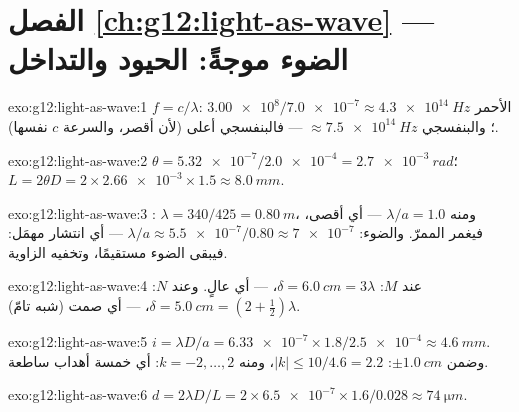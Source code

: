 \section*{الفصل \ref{ch:g12:light-as-wave} --- الضوء موجةً: الحيود والتداخل}

\begin{solution}{exo:g12:light-as-wave:1}
$f = c/\lambda$: الأحمر $\num{3.00e8}/\num{7.0e-7} \approx
\qty{4.3e14}{Hz}$؛ والبنفسجي $\approx \qty{7.5e14}{Hz}$ --- فالبنفسجي
أعلى (لأن  أقصر، والسرعة $c$ نفسها).
\end{solution}

\begin{solution}{exo:g12:light-as-wave:2}
$\theta = \num{5.32e-7}/\num{2.0e-4} = \qty{2.7e-3}{rad}$؛
$L = 2\theta D = 2 \times \num{2.66e-3} \times 1.5 \approx
\qty{8.0}{mm}$.
\end{solution}

\begin{solution}{exo:g12:light-as-wave:3}
: $\lambda = 340/425 = \qty{0.80}{m}$، ومنه $\lambda/a = 1.0$ ---
أي  أقصى، فيغمر  الممرّ. والضوء:
$\lambda/a \approx \num{5.5e-7}/0.80 \approx \num{7e-7}$ ---
أي انتشار مهمَل: فيبقى الضوء مستقيمًا، وتخفيه الزاوية.
\end{solution}

\begin{solution}{exo:g12:light-as-wave:4}
عند $M$: $\delta = \qty{6.0}{cm} = 3\lambda$،  --- أي  عالٍ.
وعند $N$: $\delta = \qty{5.0}{cm} = (2 + \tfrac12)\lambda$، 
--- أي صمت (شبه تامّ).
\end{solution}

\begin{solution}{exo:g12:light-as-wave:5}
$i = \lambda D/a = \num{6.33e-7} \times 1.8/\num{2.5e-4} \approx
\qty{4.6}{mm}$. وضمن $\pm\qty{1.0}{cm}$: $|k| \leq 10/4.6 = 2.2$،
ومنه $k = -2, \dots, 2$: أي خمسة أهداب ساطعة.
\end{solution}

\begin{solution}{exo:g12:light-as-wave:6}
$d = 2\lambda D/L = 2 \times \num{6.5e-7} \times 1.6/0.028 \approx
\qty{74}{\micro m}$.
\end{solution}

